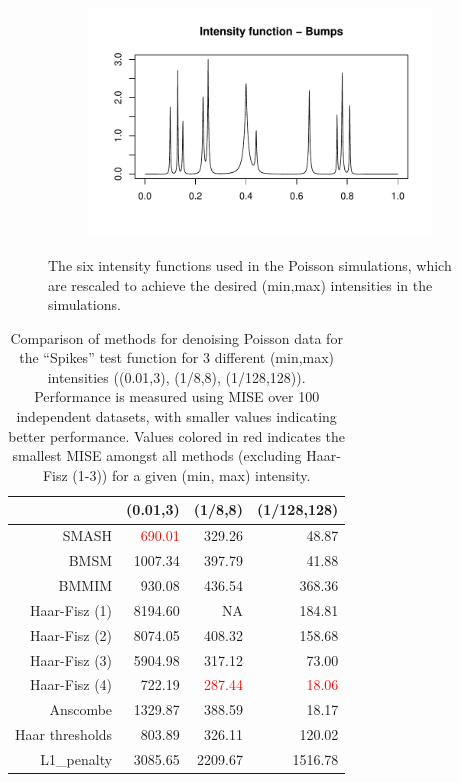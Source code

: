 \documentclass[12pt]{article}
\begin{document}
\begin{figure}
\begin{subfigure}[b]{0.48\textwidth}
        \includegraphics[width=\textwidth]{pois_bump.pdf}
        \caption{}
        \label{fig:pois_bump}
    \end{subfigure}
    \caption{The six intensity functions used in the Poisson simulations, which are rescaled to achieve the desired (min,max) intensities in the simulations.}
    \label{fig:pois_mean}
\end{figure}

\begin{table}[ht]
\centering
\begin{tabular}{rrrr}
  \hline
 & (0.01,3) & (1/8,8) & (1/128,128) \\ 
  \hline
SMASH & \textcolor{red}{690.01} & 329.26 & 48.87 \\ 
  BMSM & 1007.34 & 397.79 & 41.88 \\ 
  BMMIM & 930.08 & 436.54 & 368.36 \\ 
	Haar-Fisz (1) & 8194.60 & NA & 184.81 \\
	Haar-Fisz (2) & 8074.05 & 408.32 & 158.68 \\
	Haar-Fisz (3) & 5904.98 & 317.12 & 73.00 \\	
  Haar-Fisz (4) & 722.19 & \textcolor{red}{287.44} & \textcolor{red}{18.06} \\ 
  Anscombe & 1329.87 & 388.59 & 18.17 \\ 
  Haar thresholds & 803.89 & 326.11 & 120.02 \\ 
  L1\_penalty & 3085.65 & 2209.67 & 1516.78 \\ 
   \hline
\end{tabular}
\caption{Comparison of methods for denoising Poisson data for the ``Spikes'' test function for 3 different (min,max) intensities ((0.01,3), (1/8,8), (1/128,128)). Performance is measured using MISE over 100 independent datasets, with smaller values indicating better performance. Values colored in red indicates the smallest MISE amongst all methods (excluding Haar-Fisz (1-3)) for a given (min, max) intensity.} 
\label{table:pois_sp}
\end{table}
\end{document}
